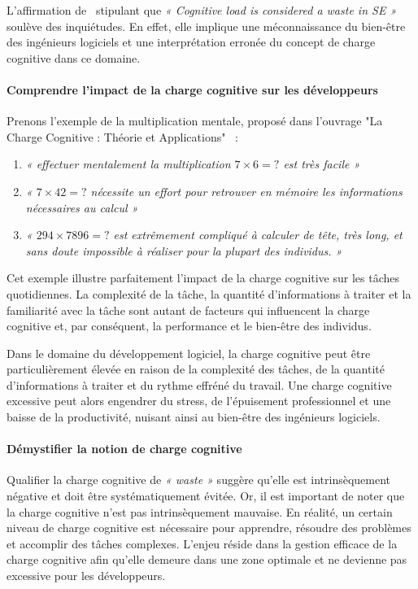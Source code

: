 L'affirmation de~\cite{SustainableEngNeglectedPerspective} stipulant que \emph{« Cognitive load is considered a waste in SE »} soulève des inquiétudes. En effet, elle implique une méconnaissance du bien-être des ingénieurs logiciels et une interprétation erronée du concept de charge cognitive dans ce domaine.

\paragraph{Comprendre l'impact de la charge cognitive sur les développeurs}
Prenons l'exemple de la multiplication mentale, proposé dans l'ouvrage "La Charge Cognitive : Théorie et Applications"~\cite{ChargeCognitive} : 

\begin{enumerate}
    \item \emph{« effectuer mentalement la multiplication $7 \times 6 = ?$ est très facile »}
    \item \emph{« $7 \times 42 = ?$ nécessite un effort pour retrouver en mémoire les informations nécessaires au calcul »}
    \item \emph{« $294 \times 7 896 = ?$ est extrêmement compliqué à calculer de tête, très long, et sans doute impossible à réaliser pour la plupart des individus. »}
\end{enumerate}


Cet exemple illustre parfaitement l'impact de la charge cognitive sur les tâches quotidiennes. La complexité de la tâche, la quantité d'informations à traiter et la familiarité avec la tâche sont autant de facteurs qui influencent la charge cognitive et, par conséquent, la performance et le bien-être des individus.


Dans le domaine du développement logiciel, la charge cognitive peut être particulièrement élevée en raison de la complexité des tâches, de la quantité d'informations à traiter et du rythme effréné du travail. Une charge cognitive excessive peut alors engendrer du stress, de l'épuisement professionnel et une baisse de la productivité, nuisant ainsi au bien-être des ingénieurs logiciels.

\paragraph{Démystifier la notion de charge cognitive}
Qualifier la charge cognitive de \emph{« waste »} suggère qu'elle est intrinsèquement négative et doit être systématiquement évitée. Or, il est important de noter que la charge cognitive n'est pas intrinsèquement mauvaise. En réalité, un certain niveau de charge cognitive est nécessaire pour apprendre, résoudre des problèmes et accomplir des tâches complexes. L'enjeu réside dans la gestion efficace de la charge cognitive afin qu'elle demeure dans une zone optimale et ne devienne pas excessive pour les développeurs.


